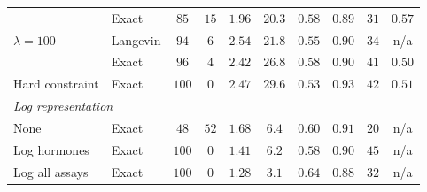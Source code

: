 \begin{table}[ht]
{\begin{tabular}{llcccccccc}
                & Exact    & $85$  & $15$ & $1.96$ & $20.3$ & $0.58$ & $0.89$ & $31$ & $0.57$ \\
$\lambda=100$   & Langevin & $94$  & $6$  & $2.54$ & $21.8$ & $0.55$ & $0.90$ & $34$ & n/a \\
                & Exact    & $96$  & $4$  & $2.42$ & $26.8$ & $0.58$ & $0.90$ & $41$ & $0.50$ \\
Hard constraint & Exact    & $100$ & $0$  & $2.47$ & $29.6$ & $0.53$ & $0.93$ & $42$ & $0.51$ \\
\midrule
\multicolumn{10}{l}{\emph{Log representation}} \\
None            & Exact    & $48$  & $52$ & $1.68$ & $6.4$  & $0.60$ & $0.91$ & $20$ & n/a \\
Log hormones    & Exact    & $100$ & $0$  & $1.41$ & $6.2$  & $0.58$ & $0.90$ & $45$ & n/a \\
Log all assays  & Exact    & $100$ & $0$  & $1.28$ & $3.1$  & $0.64$ & $0.88$ & $32$ & n/a \\
\bottomrule
\end{tabular}
}
\end{table}
